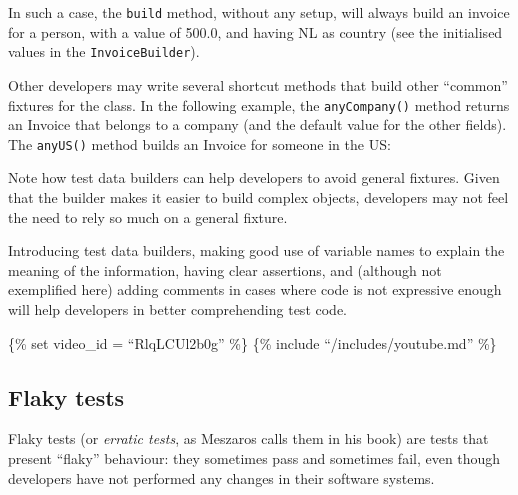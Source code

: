 In such a case, the \texttt{build} method, without any setup, will
always build an invoice for a person, with a value of 500.0, and having
NL as country (see the initialised values in the
\texttt{InvoiceBuilder}).

Other developers may write several shortcut methods that build other
``common'' fixtures for the class. In the following example, the
\texttt{anyCompany()} method returns an Invoice that belongs to a
company (and the default value for the other fields). The
\texttt{anyUS()} method builds an Invoice for someone in the US:

\begin{Shaded}
\begin{Highlighting}[]
\NormalTok{() \{}
      \NormalTok{);}
\NormalTok{\}}

\NormalTok{() \{}
      
\NormalTok{\}}
\end{Highlighting}
\end{Shaded}

Note how test data builders can help developers to avoid general
fixtures. Given that the builder makes it easier to build complex
objects, developers may not feel the need to rely so much on a general
fixture.

Introducing test data builders, making good use of variable names to
explain the meaning of the information, having clear assertions, and
(although not exemplified here) adding comments in cases where code is
not expressive enough will help developers in better comprehending test
code.

\{\% set video\_id = ``RlqLCUl2b0g'' \%\} \{\% include
``/includes/youtube.md'' \%\}

\hypertarget{flaky-tests}{%
\subsection{Flaky tests}\label{flaky-tests}}

Flaky tests (or \emph{erratic tests}, as Meszaros calls them in his
book) are tests that present ``flaky'' behaviour: they sometimes pass
and sometimes fail, even though developers have not performed any
changes in their software systems.

